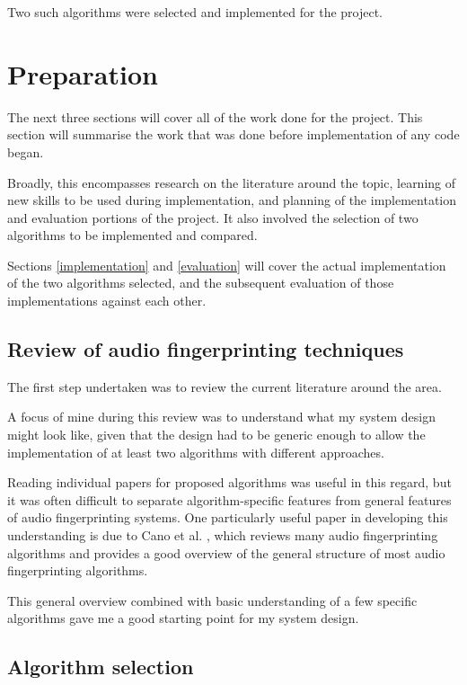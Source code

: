 \documentclass[12pt,a4paper,twoside,openright]{report}
\begin{document}
Two such algorithms were selected and implemented for the project.



\chapter{Preparation}
\label{preparation}

The next three sections will cover all of the work done for the project. This section will summarise the work that was done before implementation of any code began. 

Broadly, this encompasses research on the literature around the topic, learning of new skills to be used during implementation, and planning of the implementation and evaluation portions of the project. It also involved the selection of two algorithms to be implemented and compared.

Sections \ref{implementation} and \ref{evaluation} will cover the actual implementation of the two algorithms selected, and the subsequent evaluation of those implementations against each other.


\section{Review of audio fingerprinting techniques}

The first step undertaken was to review the current literature around the area.

A focus of mine during this review was to understand what my system design might look like, given that the design had to be generic enough to allow the implementation of at least two algorithms with different approaches. 

Reading individual papers for proposed algorithms was useful in this regard, but it was often difficult to separate algorithm-specific features from general features of audio fingerprinting systems. One particularly useful paper in developing this understanding is due to Cano et al. \cite{Cano02}, which reviews many audio fingerprinting algorithms and provides a good overview of the general structure of most audio fingerprinting algorithms. 

This general overview combined with basic understanding of a few specific algorithms gave me a good starting point for my system design.


\section{Algorithm selection}
\label{section:algoselection}
\end{document}
